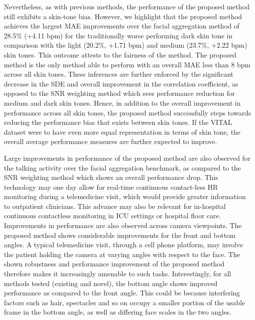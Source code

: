 Nevertheless, as with previous methods, the performance of the proposed method still exhibits a skin-tone bias. However, we highlight that the proposed method achieves the largest MAE improvements over the facial aggregation method of 28.5\% (+4.11 bpm) for the traditionally worse performing dark skin tone in comparison with the light (20.2\%, +1.71 bpm) and medium (23.7\%, +2.22 bpm) skin tones. This outcome attests to the fairness of the method. The proposed method is the only method able to perform with an overall MAE less than 8 bpm across all skin tones. These inferences are further enforced by the significant decrease in the SDE and overall improvement in the correlation coefficient, as opposed to the SNR weighting method which sees performance reduction for medium and dark skin tones. Hence, in addition to the overall improvement in performance across all skin tones, the proposed method successfully steps towards reducing the performance bias that exists between skin tones. If the VITAL dataset were to have even more equal representation in terms of skin tone, the overall average performance measures are further expected to improve. 

Large improvements in performance of the proposed method are also observed for the talking activity over the facial aggregation benchmark, as compared to the SNR weighting method which shows an overall performance drop. This technology may one day allow for real-time continuous contact-less HR monitoring during a telemedicine visit, which would provide greater information to outpatient clinicians. This advance may also be relevant for in-hospital continuous contactless monitoring in ICU settings or hospital floor care.
Improvements in performance are also observed across camera viewpoints. The proposed method shows considerable improvements for the front and bottom angles. A typical telemedicine visit, through a cell phone platform, may involve the patient holding the camera at varying angles with respect to the face. The shown robustness and performance improvement of the proposed method therefore makes it increasingly amenable to such tasks. Interestingly, for all methods tested (existing and novel), the bottom angle shows improved performance as compared to the front angle. This could be because interfering factors such as hair, spectacles and so on occupy a smaller portion of the usable frame in the bottom angle, as well as differing face scales in the two angles.


